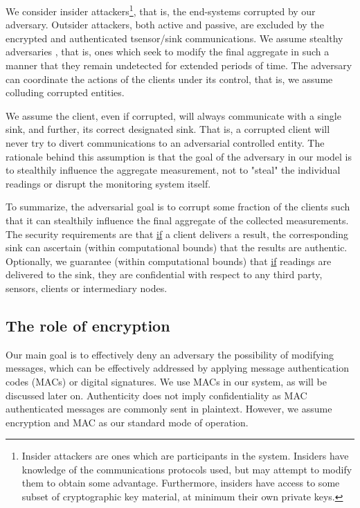 We consider insider attackers\footnote{Insider attackers are ones which are participants in the system. Insiders have knowledge of the communications protocols used, but may attempt to modify them to obtain some advantage. Furthermore, insiders have access to some subset of cryptographic key material, at minimum their own private keys.}, that is, the end-systems corrupted by our adversary. Outsider attackers, both active and passive, are excluded by the encrypted and authenticated tsensor/sink communications. We assume stealthy adversaries , that is, ones which seek to modify the final aggregate in such a manner that they remain undetected for extended periods of time. The adversary can coordinate the actions of the clients under its control, that is, we assume colluding corrupted entities.

We assume the client, even if corrupted, will always communicate with a single sink, and further, its correct designated sink. That is, a corrupted client will never try to divert communications to an adversarial controlled entity. The rationale behind this assumption is that the goal of the adversary in our model is to stealthily influence the aggregate measurement, not to "steal" the individual readings or disrupt the monitoring system itself.

To summarize, the adversarial goal is to corrupt some fraction of the clients such that it can stealthily influence the final aggregate of the collected measurements. The security requirements are that \underline{if} a client delivers a result, the corresponding sink can ascertain (within computational bounds) that the results are authentic. Optionally, we guarantee (within computational bounds) that \underline{if} readings are delivered to the sink, they are confidential with respect to any third party, sensors, clients or intermediary nodes.

%

\subsection*{The role of encryption}

Our main goal is to effectively deny an adversary the possibility of modifying messages, which can be effectively addressed by applying message authentication codes (MACs) or digital signatures. We use MACs in our system, as will be discussed later on. Authenticity does not imply confidentiality as MAC authenticated messages are commonly sent in plaintext. However, we assume encryption and MAC as our standard mode of operation. 

